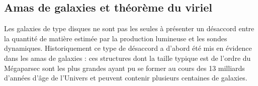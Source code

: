 \subsection{Amas de galaxies  et théorème du viriel}

Les galaxies de type disques ne sont pas les seules à présenter un désaccord entre la quantité de matière estimée par la production lumineuse et les sondes dynamiques. Historiquement ce type de désaccord a d'abord été mis en évidence dans les amas de galaxies : ces structures dont la taille typique est de l'ordre du Mégaparsec sont les plus grandes ayant pu se former au cours des 13 milliards d'années d'âge de l'Univers et peuvent contenir plusieurs centaines de galaxies.

